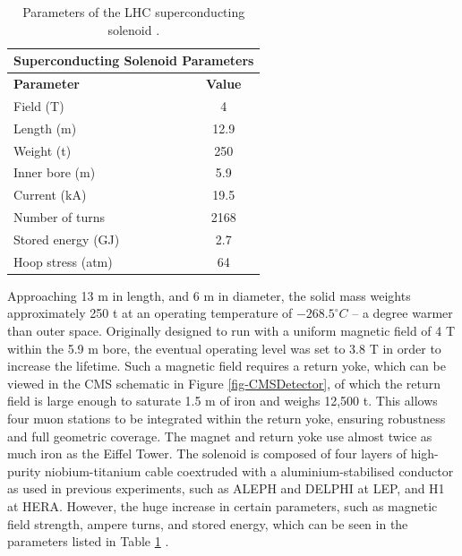 \begin{table} \label{tab-SolenoidParameters}
\begin{center}
\begin{tabular}{|l|c|}
\hline
	\multicolumn{2}{|c|}{\textbf{Superconducting Solenoid Parameters}} \\
\hline
	\textbf{Parameter} & \textbf{Value} \\
\hline
	Field (T) & 4 \\
	Length (m) & 12.9 \\
	Weight (t) & 250 \\
	Inner bore (m) & 5.9 \\
	Current (kA) & 19.5 \\
	Number of turns & 2168 \\
	Stored energy (GJ) & 2.7 \\
	Hoop stress (atm) & 64 \\
\hline
\end{tabular}	
\caption{Parameters of the LHC superconducting solenoid \cite{MagneticField}.}
\end{center}
\end{table}

Approaching 13 m in length, and 6 m in diameter, the solid mass weights approximately 250 t at an operating temperature of $-268.5^\circ C$ -- a degree warmer than outer space. Originally designed to run with a uniform magnetic field of 4 T within the 5.9 m bore, the eventual operating level was set to 3.8 T in order to increase the lifetime. Such a magnetic field requires a return yoke, which can be viewed in the CMS schematic in Figure \ref{fig-CMSDetector}, of which the return field is large enough to saturate 1.5 m of iron and weighs 12,500 t. This allows four muon stations to be integrated within the return yoke, ensuring robustness and full geometric coverage. The magnet and return yoke use almost twice as much iron as the Eiffel Tower. The solenoid is composed of four layers of high-purity niobium-titanium cable coextruded with a aluminium-stabilised conductor as used in previous experiments, such as ALEPH and DELPHI at LEP, and H1 at HERA. However, the huge increase in certain parameters, such as magnetic field strength, ampere turns, and stored energy, which can be seen in the parameters listed in Table \ref{tab-SolenoidParameters} \cite{PTDR2}. 

